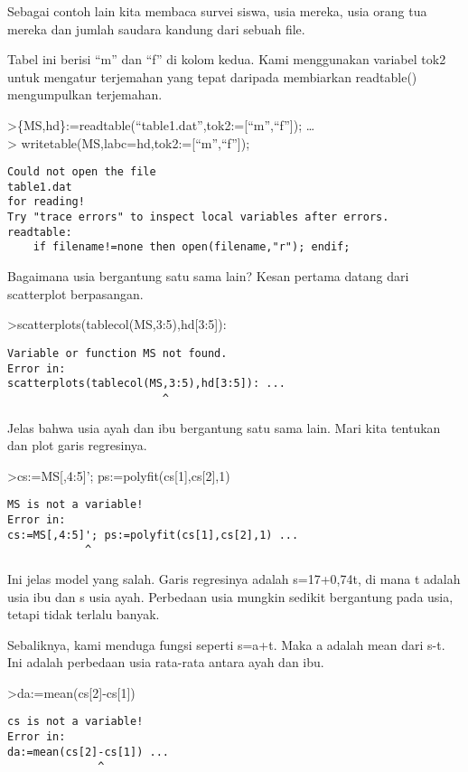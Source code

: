 \documentclass[
]{book}
\begin{document}
Sebagai contoh lain kita membaca survei siswa, usia mereka, usia orang tua mereka dan jumlah saudara kandung dari sebuah file.

Tabel ini berisi ``m'' dan ``f'' di kolom kedua. Kami menggunakan variabel tok2 untuk mengatur terjemahan yang tepat daripada membiarkan readtable() mengumpulkan terjemahan.

\textgreater\{MS,hd\}:=readtable(``table1.dat'',tok2:={[}``m'',``f''{]}); \ldots{}\\
\textgreater{} writetable(MS,labc=hd,tok2:={[}``m'',``f''{]});

\begin{verbatim}
Could not open the file
table1.dat
for reading!
Try "trace errors" to inspect local variables after errors.
readtable:
    if filename!=none then open(filename,"r"); endif;
\end{verbatim}

Bagaimana usia bergantung satu sama lain? Kesan pertama datang dari scatterplot berpasangan.

\textgreater scatterplots(tablecol(MS,3:5),hd{[}3:5{]}):

\begin{verbatim}
Variable or function MS not found.
Error in:
scatterplots(tablecol(MS,3:5),hd[3:5]): ...
                        ^
\end{verbatim}

Jelas bahwa usia ayah dan ibu bergantung satu sama lain. Mari kita tentukan dan plot garis regresinya.

\textgreater cs:=MS{[},4:5{]}'; ps:=polyfit(cs{[}1{]},cs{[}2{]},1)

\begin{verbatim}
MS is not a variable!
Error in:
cs:=MS[,4:5]'; ps:=polyfit(cs[1],cs[2],1) ...
            ^
\end{verbatim}

Ini jelas model yang salah. Garis regresinya adalah s=17+0,74t, di mana t adalah usia ibu dan s usia ayah. Perbedaan usia mungkin sedikit bergantung pada usia, tetapi tidak terlalu banyak.

Sebaliknya, kami menduga fungsi seperti s=a+t. Maka a adalah mean dari s-t. Ini adalah perbedaan usia rata-rata antara ayah dan ibu.

\textgreater da:=mean(cs{[}2{]}-cs{[}1{]})

\begin{verbatim}
cs is not a variable!
Error in:
da:=mean(cs[2]-cs[1]) ...
              ^
\end{verbatim}
\end{document}
